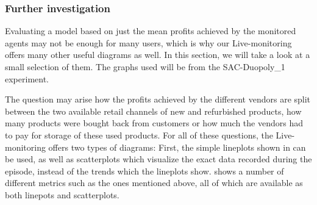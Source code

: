 \subsubsection*{Further investigation}

Evaluating a model based on just the mean profits achieved by the monitored agents may not be enough for many users, which is why our Live-monitoring offers many other useful diagrams as well. In this section, we will take a look at a small selection of them. The graphs used will be from the SAC-Duopoly\_1 experiment.

The question may arise how the profits achieved by the different vendors are split between the two available retail channels of new and refurbished products, how many products were bought back from customers or how much the vendors had to pay for storage of these used products. For all of these questions, the Live-monitoring offers two types of diagrams: First, the simple lineplots shown in  can be used, as well as scatterplots which visualize the exact data recorded during the episode, instead of the trends which the lineplots show.  shows a number of different metrics such as the ones mentioned above, all of which are available as both linepots and scatterplots.

